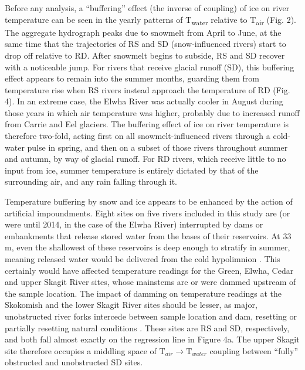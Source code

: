 \documentclass[notitlepage]{article}
\begin{document}
Before any analysis, a ``buffering'' effect (the inverse of coupling) of ice on river temperature can be seen in the yearly patterns of T\textsubscript{water} relative to T\textsubscript{air} (Fig. 2). The aggregate hydrograph peaks due to snowmelt from April to June, at the same time that the trajectories of RS and SD (snow-influenced rivers) start to drop off relative to RD. After snowmelt begins to subside, RS and SD recover with a noticeable jump. For rivers that receive glacial runoff (SD), this buffering effect appears to remain into the summer months, guarding them from temperature rise when RS rivers instead approach the temperature of RD (Fig. 4). In an extreme case, the Elwha River was actually cooler in August during those years in which air temperature was higher, probably due to increased runoff from Carrie and Eel glaciers. The buffering effect of ice on river temperature is therefore two-fold, acting first on all snowmelt-influenced rivers through a cold-water pulse in spring, and then on a subset of those rivers throughout summer and autumn, by way of glacial runoff. For RD rivers, which receive little to no input from ice, summer temperature is entirely dictated by that of the surrounding air, and any rain falling through it.

Temperature buffering by snow and ice appears to be enhanced by the action of artificial impoundments. Eight sites on five rivers included in this study are (or were until 2014, in the case of the Elwha River) interrupted by dams or embankments that release stored water from the bases of their reservoirs. At 33 m, even the shallowest of these reservoirs is deep enough to stratify in summer, meaning released water would be delivered from the cold hypolimnion \citep{olden_hypoCold}. This certainly would have affected temperature readings for the Green, Elwha, Cedar and upper Skagit River sites, whose mainstems are or were dammed upstream of the sample location. The impact of damming on temperature readings at the Skokomish and the lower Skagit River sites should be lesser, as major, unobstructed river forks intercede between sample location and dam, resetting or partially resetting natural conditions \citep{stanford2001revisiting}. These sites are RS and SD, respectively, and both fall almost exactly on the regression line in Figure 4a. The upper Skagit site therefore occupies a middling space of $\textrm{T}_{air}\rightarrow \textrm{T}_{water}$ coupling between ``fully'' obstructed and unobstructed SD sites.
\end{document}
